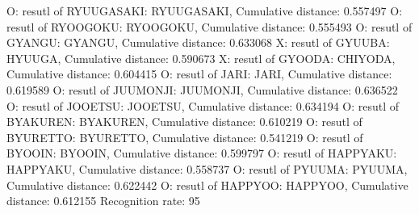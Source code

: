 O: resutl of RYUUGASAKI: RYUUGASAKI, Cumulative distance: 0.557497
O: resutl of RYOOGOKU: RYOOGOKU, Cumulative distance: 0.555493
O: resutl of GYANGU: GYANGU, Cumulative distance: 0.633068
X: resutl of GYUUBA: HYUUGA, Cumulative distance: 0.590673
X: resutl of GYOODA: CHIYODA, Cumulative distance: 0.604415
O: resutl of JARI: JARI, Cumulative distance: 0.619589
O: resutl of JUUMONJI: JUUMONJI, Cumulative distance: 0.636522
O: resutl of JOOETSU: JOOETSU, Cumulative distance: 0.634194
O: resutl of BYAKUREN: BYAKUREN, Cumulative distance: 0.610219
O: resutl of BYURETTO: BYURETTO, Cumulative distance: 0.541219
O: resutl of BYOOIN: BYOOIN, Cumulative distance: 0.599797
O: resutl of HAPPYAKU: HAPPYAKU, Cumulative distance: 0.558737
O: resutl of PYUUMA: PYUUMA, Cumulative distance: 0.622442
O: resutl of HAPPYOO: HAPPYOO, Cumulative distance: 0.612155
Recognition rate: 95%
